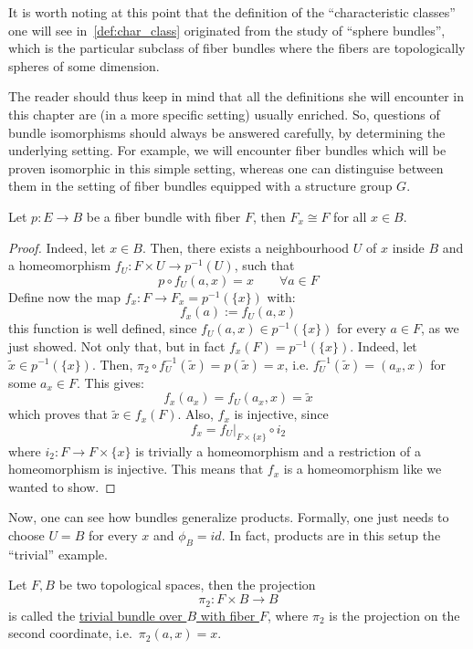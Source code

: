 It is worth noting at this point that the definition of the ``characteristic classes'' one will see in~\ref{def:char_class} originated from the study of ``sphere bundles'', which is the particular subclass of fiber bundles where the fibers are topologically spheres of some dimension.

The reader should thus keep in mind that all the definitions she will encounter in this chapter are (in a more specific setting) usually enriched. So, questions of bundle isomorphisms should always be answered carefully, by determining the underlying setting. For example, we will encounter fiber bundles which will be proven isomorphic in this simple setting, whereas one can distinguise between them in the setting of fiber bundles equipped with a structure group $G$.

\begin{proposition}\label{prop:same_fiber} Let $p:E\to B$ be a fiber bundle with fiber $F$, then $F_x\cong F$ for all $x\in B$.
\end{proposition}
\begin{proof}
Indeed, let $x\in B$. Then, there exists a neighbourhood $U$ of $x$ inside $B$ and a homeomorphism $f_U:F\times U\to p^{-1}(U)$, such that
\[p\circ f_U(a,x)=x\qquad \forall a\in F\]
Define now the map $f_x:F\to F_x=p^{-1}(\{x\})$ with:
\[f_x(a):=f_U(a,x)\]
this function is well defined, since $f_U(a,x)\in p^{-1}(\{x\})$ for every $a\in F$, as we just showed. Not only that, but in fact $f_x(F)=p^{-1}(\{x\})$. Indeed, let $\tilde{x}\in p^{-1}(\{x\})$. Then, $\pi_2\circ f_U^{-1}(\tilde{x})=p(\tilde{x})=x$, i.e. $f_U^{-1}(\tilde{x})=(a_x,x)$ for some $a_x\in F$. This gives:
\[f_x(a_x)=f_U(a_x,x)=\tilde{x}\]
which proves that $\tilde{x}\in f_x(F)$. Also, $f_x$ is injective, since
\[f_x=f_U|_{F\times\{x\}}\circ i_2\]
where $i_2:F\to F\times\{x\}$ is trivially a homeomorphism and a restriction of a homeomorphism is injective. This means that $f_x$ is a homeomorphism like we wanted to show.
\end{proof}

Now, one can see how bundles generalize products. Formally, one just needs to choose $U=B$ for every $x$ and $\phi_B=id$. In fact, products are in this setup the ``trivial'' example.
\begin{definition} Let $F, B$ be two topological spaces, then the projection
\[\pi_2:F\times B\to B\]
is called the \ul{trivial bundle over $B$ with fiber $F$}, where $\pi_2$ is the projection on the second coordinate, i.e.\ $\pi_2(a,x)=x$.
\end{definition}

